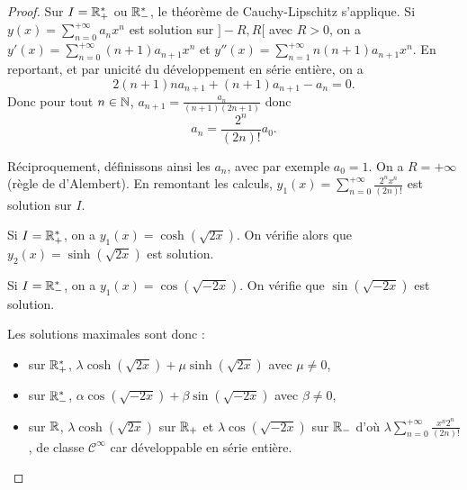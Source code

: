 \documentclass[12pt]{article}
\begin{document}
\begin{proof}
	Sur $I=\mathbb{R}_{+}^{*}$ ou $\mathbb{R}_{-}^{*}$, le théorème de Cauchy-Lipschitz s'applique. Si $y(x)=\sum_{n=0}^{+\infty}a_n x^{n}$ est solution sur $]-R,R[$ avec $R>0$, on a $y'(x)=\sum_{n=0}^{+\infty}(n+1)a_{n+1}x^{n}$ et $y''(x)=\sum_{n=1}^{+\infty}n(n+1)a_{n+1}x^{n}$. En reportant, et par unicité du développement en série entière, on a 
	\begin{equation}
		2(n+1)n a_{n+1}+(n+1)a_{n+1}-a_n=0.
	\end{equation}
	Donc pour tout $n\in\mathbb{N}$, $a_{n+1}=\frac{a_n}{(n+1)(2n+1)}$ donc 
	\begin{equation}
		a_n=\frac{2^{n}}{(2n)!}a_0.
	\end{equation}

	Réciproquement, définissons ainsi les $a_n$, avec par exemple $a_0=1$. On a $R=+\infty$ (règle de d'Alembert). En remontant les calculs, $y_1(x)=\sum_{n=0}^{+\infty}\frac{2^{n}x^{n}}{(2n)!}$ est solution sur $I$.

	Si $I=\mathbb{R}_{+}^{*}$, on a $y_1(x)=\cosh(\sqrt{2x})$. On vérifie alors que $y_2(x)=\sinh(\sqrt{2x})$ est solution.

	Si $I=\mathbb{R}_{-}^{*}$, on a $y_1(x)=\cos(\sqrt{-2x})$. On vérifie que $\sin(\sqrt{-2x})$ est solution.

	Les solutions maximales sont donc :
	\begin{itemize}
		\item sur $\mathbb{R}_{+}^{*}$, $\lambda\cosh(\sqrt{2x})+\mu\sinh(\sqrt{2x})$ avec $\mu\neq0$,
		\item sur $\mathbb{R}_{-}^{*}$, $\alpha\cos(\sqrt{-2x})+\beta\sin(\sqrt{-2x})$ avec $\beta\neq0$,
		\item sur $\mathbb{R}$, $\lambda\cosh(\sqrt{2x})$ sur $\mathbb{R}_{+}$ et $\lambda\cos(\sqrt{-2x})$ sur $\mathbb{R}_{-}$ d'où $\lambda\sum_{n=0}^{+\infty}\frac{x^{n}2^{n}}{(2n)!}$, de classe $\mathcal{C}^{\infty}$ car développable en série entière.
	\end{itemize}
\end{proof}
\end{document}
